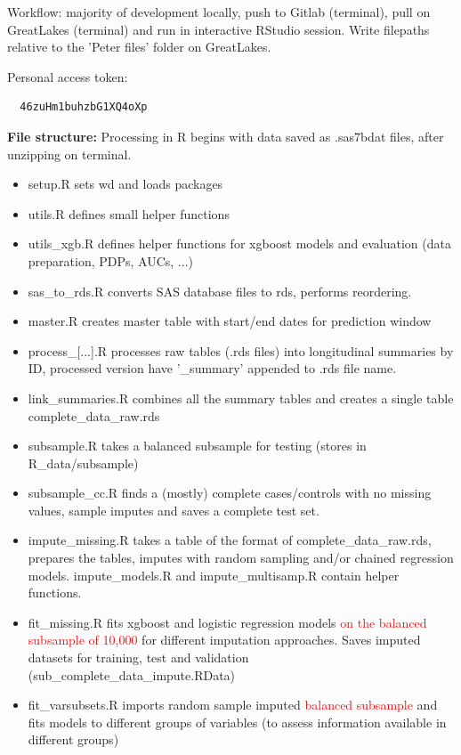 \documentclass[12pt]{article}
\newcommand{\note}[1]{\textcolor{red}{#1}}
\begin{document}
Workflow: majority of development locally, push to Gitlab (terminal), pull on GreatLakes (terminal) and run in interactive RStudio session. Write filepaths relative to the 'Peter files' folder on GreatLakes.

Personal access token:
\begin{verbatim}
  46zuHm1buhzbG1XQ4oXp
\end{verbatim}

{\bf File structure:}
Processing in R begins with data saved as .sas7bdat files, after unzipping on terminal.
\begin{itemize}
  \item setup.R sets wd and loads packages
  \item utils.R defines small helper functions
  \item utils\_xgb.R defines helper functions for xgboost models and evaluation (data preparation, PDPs, AUCs, ...)
  \item sas\_to\_rds.R converts SAS database files to rds, performs reordering.
  \item master.R creates master table with start/end dates for prediction window
  \item process\_[...].R processes raw tables (.rds files) into longitudinal summaries by ID, processed version have '\_summary' appended to .rds file name.
  \item link\_summaries.R combines all the summary tables and creates a single table complete\_data\_raw.rds
  \item subsample.R takes a balanced subsample for testing (stores in R\_data/subsample)
  \item subsample\_cc.R finds a (mostly) complete cases/controls with no missing values, sample imputes and saves a complete test set.
  \item impute\_missing.R takes a table of the format of complete\_data\_raw.rds, prepares the tables, imputes with random sampling and/or chained regression models. impute\_models.R and impute\_multisamp.R contain helper functions.
  \item fit\_missing.R fits xgboost and logistic regression models \note{on the balanced subsample of 10,000} for different imputation approaches. Saves imputed datasets for training, test and validation (sub\_complete\_data\_impute.RData)
  \item fit\_varsubsets.R imports random sample imputed \note{balanced subsample} and fits models to different groups of variables (to assess information available in different groups)
\end{itemize}
\end{document}
